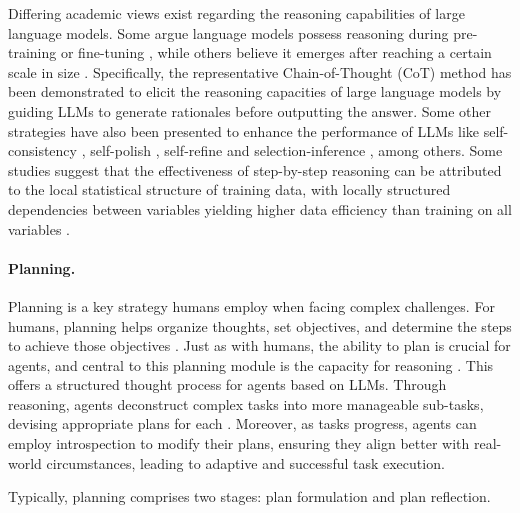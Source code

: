 Differing academic views exist regarding the reasoning capabilities of large language models. Some argue language models possess reasoning during pre-training or fine-tuning \cite{DBLP:conf/acl/0009C23}, while others believe it emerges after reaching a certain scale in size \cite{DBLP:journals/tmlr/WeiTBRZBYBZMCHVLDF22, DBLP:journals/corr/abs-2212-09196}. 
Specifically, the representative Chain-of-Thought (CoT) method \cite{DBLP:conf/nips/Wei0SBIXCLZ22,DBLP:conf/nips/KojimaGRMI22} has been demonstrated to elicit the reasoning capacities of large language models by guiding LLMs to generate rationales before outputting the answer.
Some other strategies have also been presented to enhance the performance of LLMs like self-consistency \cite{DBLP:conf/iclr/0002WSLCNCZ23}, self-polish \cite{DBLP:journals/corr/abs-2305-14497}, self-refine \cite{DBLP:journals/corr/abs-2303-17651} and selection-inference \cite{DBLP:conf/iclr/CreswellSH23}, among others.
Some studies suggest that the effectiveness of step-by-step reasoning can be attributed to the local statistical structure of training data, with locally structured dependencies between variables yielding higher data efficiency than training on all variables \cite{DBLP:journals/corr/abs-2305-15408}.

\paragraph{Planning.}

Planning is a key strategy humans employ when facing complex challenges. For humans, planning helps organize thoughts, set objectives, and determine the steps to achieve those objectives \cite{grafman2004planning,unterrainer2006planning,zula2007integrative}.
Just as with humans, the ability to plan is crucial for agents, and central to this planning module is the capacity for reasoning \cite{bratman1988plans,DBLP:books/lib/RussellN03,fainstein2015readings}.  
This offers a structured thought process for agents based on LLMs. Through reasoning, agents deconstruct complex tasks into more manageable sub-tasks, devising appropriate plans for each \cite{sebastia2006decomposition,crosby2013automated}. 
Moreover, as tasks progress, agents can employ introspection to modify their plans, ensuring they align better with real-world circumstances, leading to adaptive and successful task execution.

Typically, planning comprises two stages: plan formulation and plan reflection.

